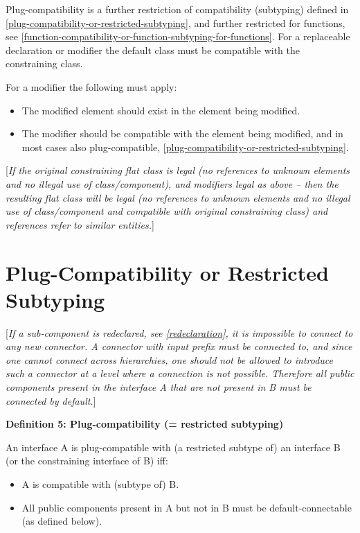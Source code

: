 \documentclass[../MLS.tex]{subfiles}
\begin{document}
Plug-compatibility is a further restriction of compatibility (subtyping)
defined in \autoref{plug-compatibility-or-restricted-subtyping}, and further restricted for functions, see
\autoref{function-compatibility-or-function-subtyping-for-functions}. For a replaceable declaration or modifier the default class
must be compatible with the constraining class.

For a modifier the following must apply:

\begin{itemize}
\item
  The modified element should exist in the element being modified.
\item
  The modifier should be compatible with the element being modified, and
  in most cases also plug-compatible, \autoref{plug-compatibility-or-restricted-subtyping}.
\end{itemize}

{[}\emph{If the original constraining flat class is legal (no references
to unknown elements and no illegal use of class/component), and
modifiers legal as above -- then the resulting flat class will be legal
(no references to unknown elements and no illegal use of class/component
and compatible with original constraining class) and references refer to
similar entities.}{]}

\section{Plug-Compatibility or Restricted Subtyping}

{[}\emph{If a sub-component is redeclared, see \autoref{redeclaration}, it is
impossible to connect to any new connector. A connector with input
prefix must be connected to, and since one cannot connect across
hierarchies, one should not be allowed to introduce such a connector at
a level where a connection is not possible. Therefore all public
components present in the interface A that are not present in B must be
connected by default.}{]}

\textbf{Definition 5: Plug-compatibility (= restricted subtyping)}

An interface A is plug-compatible with (a restricted subtype of) an
interface B (or the constraining interface of B) iff:

\begin{itemize}
\item
  A is compatible with (subtype of) B.
\item
  All public components present in A but not in B must be
  default-connectable (as defined below).
\end{itemize}
\end{document}
